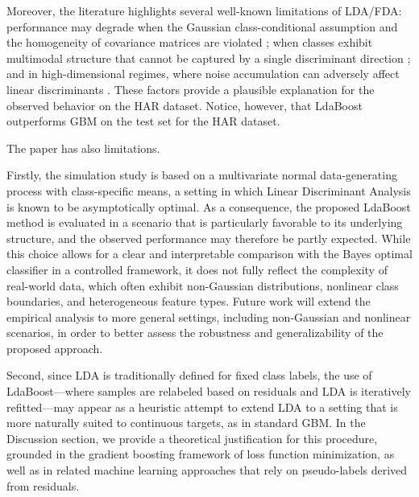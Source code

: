 \documentclass[11pt,a4paper]{article}
\begin{document}
{Moreover, the literature highlights several well-known limitations of LDA/FDA: performance may degrade when the Gaussian class-conditional assumption and the homogeneity of covariance matrices are violated \citep{hastie2009elements}; when classes exhibit multimodal structure that cannot be captured by a single discriminant direction \citep{sugiyama2007lda}; and in high-dimensional regimes, where noise accumulation can adversely affect linear discriminants \citep{fan2008highdim}. These factors provide a plausible explanation for the observed behavior on the HAR dataset. Notice, however, that LdaBoost outperforms GBM on the test set for the HAR dataset.

The paper has also limitations.

Firstly, the simulation study is based on a multivariate normal data-generating process with class-specific means, a setting in which Linear Discriminant Analysis is known to be asymptotically optimal. As a consequence, the proposed LdaBoost method is evaluated in a scenario that is particularly favorable to its underlying structure, and the observed performance may therefore be partly expected. While this choice allows for a clear and interpretable comparison with the Bayes optimal classifier in a controlled framework, it does not fully reflect the complexity of real-world data, which often exhibit non-Gaussian distributions, nonlinear class boundaries, and heterogeneous feature types. Future work will extend the empirical analysis to more general settings, including non-Gaussian and nonlinear scenarios, in order to better assess the robustness and generalizability of the proposed approach.

Second, since LDA is traditionally defined for fixed class labels, the use of LdaBoost---where samples are relabeled based on residuals and LDA is iteratively refitted---may appear as a heuristic attempt to extend LDA to a setting that is more naturally suited to continuous targets, as in standard GBM. In the Discussion section, we provide a theoretical justification for this procedure, grounded in the gradient boosting framework of loss function minimization, as well as in related machine learning approaches that rely on pseudo-labels derived from residuals.
}

\newpage
\end{document}

